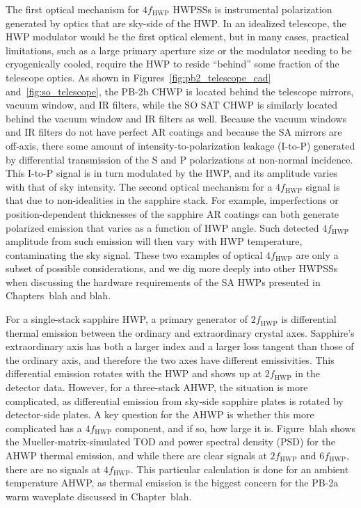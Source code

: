 The first optical mechanism for $4 f_{\mathrm{HWP}}$ HWPSSs is instrumental polarization generated by optics that are sky-side of the HWP. In an idealized telescope, the HWP modulator would be the first optical element, but in many cases, practical limitations, such as a large primary aperture size or the modulator needing to be cryogenically cooled, require the HWP to reside ``behind'' some fraction of the telescope optics. As shown in Figures~\ref{fig:pb2_telescope_cad} and~\ref{fig:so_telescope}, the PB-2b CHWP is located behind the telescope mirrors, vacuum window, and IR filters, while the SO SAT CHWP is similarly located behind the vacuum window and IR filters as well. Because the vacuum windows and IR filters do not have perfect AR coatings and because the SA mirrors are off-axis, there some amount of intensity-to-polarization leakage (I-to-P) generated by differential transmission of the S and P polarizations at non-normal incidence. This I-to-P signal is in turn modulated by the HWP, and its amplitude varies with that of sky intensity. The second optical mechanism for a $4 f_{\mathrm{HWP}}$ signal is that due to non-idealities in the sapphire stack. For example, imperfections or position-dependent thicknesses of the sapphire AR coatings can both generate polarized emission that varies as a function of HWP angle. Such detected $4 f_{\mathrm{HWP}}$ amplitude from such emission will then vary with HWP temperature, contaminating the sky signal. These two examples of optical $4 f_{\mathrm{HWP}}$ are only a subset of possible considerations, and we dig more deeply into other HWPSSs when discussing the hardware requirements of the SA HWPs presented in Chapters~blah and blah.

For a single-stack sapphire HWP, a primary generator of $2 f_{\mathrm{HWP}}$ is differential thermal emission between the ordinary and extraordinary crystal axes. Sapphire's extraordinary axis has both a larger index and a larger loss tangent than those of the ordinary axis, and therefore the two axes have different emissivities. This differential emission rotates with the HWP and shows up at $2 f_{\mathrm{HWP}}$ in the detector data. However, for a three-stack AHWP, the situation is more complicated, as differential emission from sky-side sapphire plates is rotated by detector-side plates. A key question for the AHWP is whether this more complicated has a $4 f_{\mathrm{HWP}}$ component, and if so, how large it is. Figure~blah shows the Mueller-matrix-simulated TOD and power spectral density (PSD) for the AHWP thermal emission, and while there are clear signals at $2 f_{\mathrm{HWP}}$ and $6 f_{\mathrm{HWP}}$, there are no signals at $4 f_{\mathrm{HWP}}$. This particular calculation is done for an ambient temperature AHWP, as thermal emission is the biggest concern for the PB-2a warm waveplate discussed in Chapter~blah.

